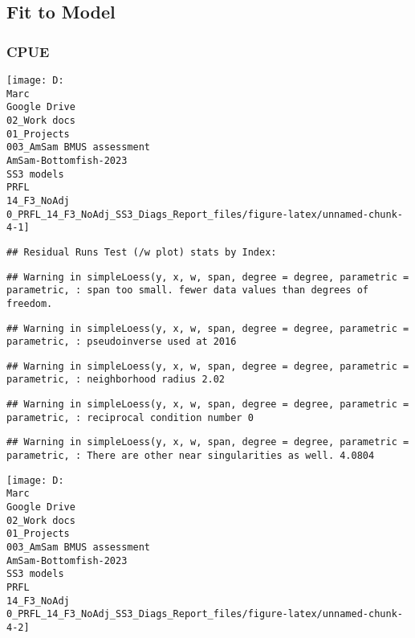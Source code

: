 \documentclass[
]{article}
\begin{document}
\hypertarget{fit-to-model}{%
\subsection{Fit to Model}\label{fit-to-model}}

\hypertarget{cpue}{%
\subsubsection{CPUE}\label{cpue}}

\begin{center}\texttt{[image: D:\\Marc\\Google Drive\\02\_Work docs\\01\_Projects\\003\_AmSam BMUS assessment\\AmSam-Bottomfish-2023\\SS3 models\\PRFL\\14\_F3\_NoAdj\\0\_PRFL\_14\_F3\_NoAdj\_SS3\_Diags\_Report\_files/figure-latex/unnamed-chunk-4-1]} \end{center}

\begin{verbatim}
## Residual Runs Test (/w plot) stats by Index:
\end{verbatim}

\begin{verbatim}
## Warning in simpleLoess(y, x, w, span, degree = degree, parametric = parametric, : span too small. fewer data values than degrees of freedom.
\end{verbatim}

\begin{verbatim}
## Warning in simpleLoess(y, x, w, span, degree = degree, parametric = parametric, : pseudoinverse used at 2016
\end{verbatim}

\begin{verbatim}
## Warning in simpleLoess(y, x, w, span, degree = degree, parametric = parametric, : neighborhood radius 2.02
\end{verbatim}

\begin{verbatim}
## Warning in simpleLoess(y, x, w, span, degree = degree, parametric = parametric, : reciprocal condition number 0
\end{verbatim}

\begin{verbatim}
## Warning in simpleLoess(y, x, w, span, degree = degree, parametric = parametric, : There are other near singularities as well. 4.0804
\end{verbatim}

\begin{center}\texttt{[image: D:\\Marc\\Google Drive\\02\_Work docs\\01\_Projects\\003\_AmSam BMUS assessment\\AmSam-Bottomfish-2023\\SS3 models\\PRFL\\14\_F3\_NoAdj\\0\_PRFL\_14\_F3\_NoAdj\_SS3\_Diags\_Report\_files/figure-latex/unnamed-chunk-4-2]} \end{center}
\end{document}
